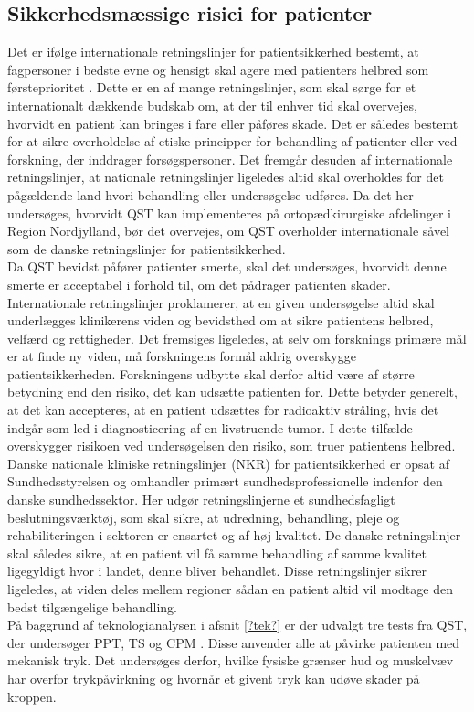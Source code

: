 \subsection{Sikkerhedsmæssige risici for patienter}
Det er ifølge internationale retningslinjer for patientsikkerhed bestemt, at fagpersoner i bedste evne og hensigt skal agere med patienters helbred som førsteprioritet \cite{helsinki2013}. Dette er en af mange retningslinjer, som skal sørge for et internationalt dækkende budskab om, at der til enhver tid skal overvejes, hvorvidt en patient kan bringes i fare eller påføres skade. Det er således bestemt for at sikre overholdelse af etiske principper for behandling af patienter eller ved forskning, der inddrager forsøgspersoner. Det fremgår desuden af internationale retningslinjer, at nationale retningslinjer ligeledes altid skal overholdes for det pågældende land hvori behandling eller undersøgelse udføres. Da det her undersøges, hvorvidt QST kan implementeres på ortopædkirurgiske afdelinger i Region Nordjylland, bør det overvejes, om QST overholder internationale såvel som de danske retningslinjer for patientsikkerhed. \cite{helsinki2013} \\
Da QST bevidst påfører patienter smerte, skal det undersøges, hvorvidt denne smerte er acceptabel i forhold til, om det pådrager patienten skader. Internationale retningslinjer proklamerer, at en given undersøgelse altid skal underlægges klinikerens viden og bevidsthed om at sikre patientens helbred, velfærd og rettigheder. Det fremsiges ligeledes, at selv om forsknings primære mål er at finde ny viden, må forskningens formål aldrig overskygge patientsikkerheden. Forskningens udbytte skal derfor altid være af større betydning end den risiko, det kan udsætte patienten for. \cite{helsinki2013} Dette betyder generelt, at det kan accepteres, at en patient udsættes for radioaktiv stråling, hvis det indgår som led i diagnosticering af en livstruende tumor. I dette tilfælde overskygger risikoen ved undersøgelsen den risiko, som truer patientens helbred. Danske nationale kliniske retningslinjer (NKR) for patientsikkerhed er opsat af Sundhedsstyrelsen og omhandler primært sundhedsprofessionelle indenfor den danske sundhedssektor. Her udgør retningslinjerne et sundhedsfagligt beslutningsværktøj, som skal sikre, at udredning, behandling, pleje og rehabiliteringen i sektoren er ensartet og af høj kvalitet. \cite{nkr2016, kommissorium2012} De danske retningslinjer skal således sikre, at en patient vil få samme behandling af samme kvalitet ligegyldigt hvor i landet, denne bliver behandlet. Disse retningslinjer sikrer ligeledes, at viden deles mellem regioner sådan en patient altid vil modtage den bedst tilgængelige behandling. \cite{nkr2016} \\
På baggrund af teknologianalysen i afsnit \ref{?tek?} er der udvalgt tre tests fra QST, der undersøger PPT, TS og CPM . Disse anvender alle at påvirke patienten med mekanisk tryk. Det undersøges derfor, hvilke fysiske grænser hud og muskelvæv har overfor trykpåvirkning og hvornår et givent tryk kan udøve skader på kroppen. \\
